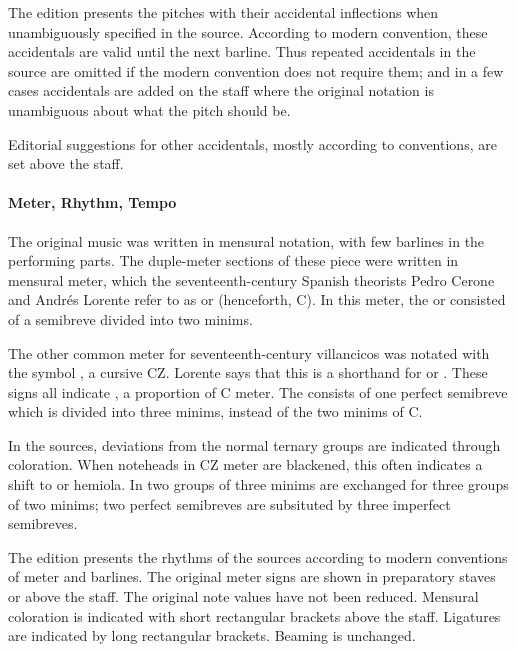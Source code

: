 The edition presents the pitches with their accidental inflections when unambiguously specified in the source.
According to modern convention, these accidentals are valid until the next barline.
Thus repeated accidentals in the source are omitted if the modern convention does not require them; and in a few cases accidentals are added on the staff where the original notation is unambiguous about what the pitch should be.

Editorial suggestions for other accidentals, mostly according to  conventions, are set above the staff.

\paragraph{Meter, Rhythm, Tempo}
The original music was written in mensural notation, with few barlines in the performing parts. 
The duple-meter sections of these piece were written in mensural \meterC{} meter, which the seventeenth-century Spanish theorists Pedro Cerone and Andrés Lorente refer to as  or  (henceforth, C).%
  \autocites[537]{Cerone:Melopeo}[156, 210]{Lorente:Porque}
In this meter, the  or  consisted of a semibreve divided into two minims.%
  \autocites{GonzalezValle:MusicaTexto}{GonzalezValle:CompasCabezon}

The other common meter for seventeenth-century villancicos was notated with the symbol \meterCZ{}, a cursive CZ.
Lorente says that this is a shorthand for \meterCThree{} or \meterCThreeTwo{}.%
  \autocite[165]{Lorente:Porque}
These signs all indicate , a proportion of C meter.
The  consists of one perfect semibreve which is divided into three minims, instead of the two minims of C.

In the sources, deviations from the normal ternary groups are indicated through coloration. 
When noteheads in CZ meter are blackened, this often indicates a shift to  or hemiola.
In  two groups of three minims are exchanged for three groups of two minims; two perfect semibreves are subsituted by three imperfect semibreves.

The edition presents the rhythms of the sources according to modern conventions of meter and barlines.
The original meter signs are shown in preparatory staves or above the staff.
The original note values have not been reduced.
Mensural coloration is indicated with short rectangular brackets above the staff.
Ligatures are indicated by long rectangular brackets.
Beaming is unchanged.

